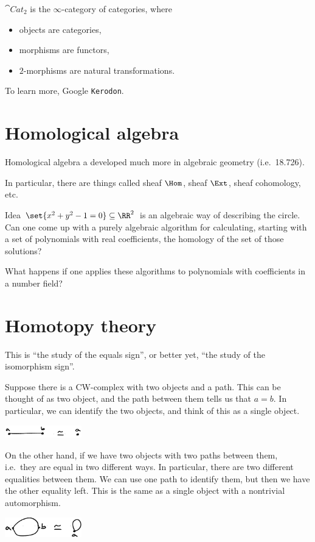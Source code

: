 \documentclass{standalone}
\begin{document}
\begin{example}
  \(\cat{Cat}_2\) is the \(\infty\)-category of categories, where
  \begin{itemize}
    \item objects are categories,
    \item morphisms are functors,
    \item \(2\)-morphisms are natural transformations.
  \end{itemize}
\end{example}

To learn more, Google \texttt{Kerodon}.


\section{Homological algebra}
Homological algebra a developed much more in algebraic geometry (i.e.\ 18.726).

In particular, there are things called sheaf \(\Hom\), sheaf \(\Ext\),
sheaf cohomology, etc.

\begin{adhoctheorem}{Idea}
  \(\set{x^2 + y^2 - 1 = 0} \subseteq \RR^2\) is an algebraic way
  of describing the circle.
  Can one come up with a purely algebraic algorithm for calculating,
  starting with a set of polynomials with real coefficients,
  the homology of the set of those solutions?

  What happens if one applies these algorithms to polynomials
  with coefficients in a number field?
\end{adhoctheorem}


\section{Homotopy theory}
This is ``the study of the equals sign'', or better yet,
``the study of the isomorphism sign''.

Suppose there is a CW-complex with two objects and a path.
This can be thought of as two object,
and the path between them tells us that \(a = b\).
In particular, we can identify the two objects,
and think of this as a single object.
\begin{center}
  \includegraphics[width=0.25\textwidth]{18_905-201207-1.png}
\end{center}

On the other hand, if we have two objects with two paths between them,
i.e.\ they are equal in two different ways.
In particular, there are two different equalities between them.
We can use one path to identify them,
but then we have the other equality left.
This is the same as a single object with a nontrivial automorphism.
\begin{center}
  \includegraphics[width=0.25\textwidth]{18_905-201207-2.png}
\end{center}
\end{document}

